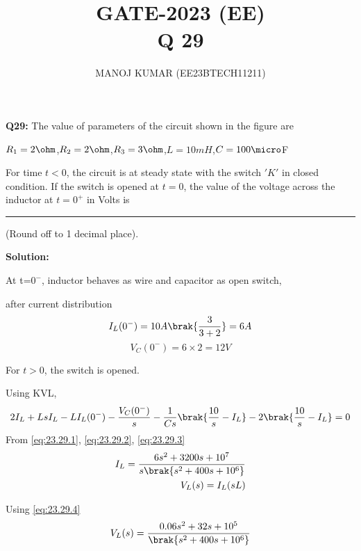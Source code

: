 \documentclass[journal,12pt,twocolumn]{IEEEtran}
\theoremstyle{remark}
\begin{document}

\vspace{3cm}

\title{GATE-2023 (EE) \\Q 29}
\author{MANOJ KUMAR (EE23BTECH11211)}
\maketitle
\newpage

\bigskip

\renewcommand{\thefigure}{\theenumi}
\renewcommand{\thetable}{\theenumi}
\textbf{Q29:}
 The value of parameters of the circuit shown in the figure are
 \begin{center}
 $R_1=2\ohm$,$R_2=2\ohm$,$R_3=3\ohm$,$L=10 mH$,$C=100\micro$F
 \end{center}
 For time \(t<0\), the circuit is at steady state with the switch $ 'K'$ in closed condition. If the switch is opened at $t=0$, the value of the voltage across the inductor 
 at $t=0^{+}$ in Volts is \rule{2cm}{0.4pt} (Round off to 1 decimal place). 


\textbf{Solution:}


At t=$0^-$, inductor behaves as wire and capacitor as open switch,


after current distribution
\begin{equation}
    I_L(0^-) = 10A\brak{\frac{3}{3+2}}=6 A\\
    \label{eq:23.29.1}
 \end{equation}  
 \begin{equation}
    V_C(0^-)= 6\times2= 12 V
     \label{eq:23.29.2}
\end{equation}

For $t>0$, the switch is opened.


Using KVL,\\
\begin{multline}
2I_L+LsI_L-LI_L(0^-)-\frac{V_C(0^-)}{s}-\frac{1}{Cs}\brak{\frac{10}{s}-I_L}-2\brak{\frac{10}{s}-I_L}=0
   \label{eq:23.29.3}
\end{multline}
From \eqref{eq:23.29.1}, \eqref{eq:23.29.2}, \eqref{eq:23.29.3}
\begin{align}
I_L=\frac{6s^2+3200s+10^7}{s\brak{s^2+400s+10^6}}
\label{eq:23.29.4}\\
V_L(s)=I_L(sL)
\end{align}

Using \eqref{eq:23.29.4}
\begin{align}
V_L(s)=\frac{0.06s^2+32s+10^5}{\brak{s^2+400s+10^6}}
\label{eq:23.29.6}
\end{align}
\end{document}

